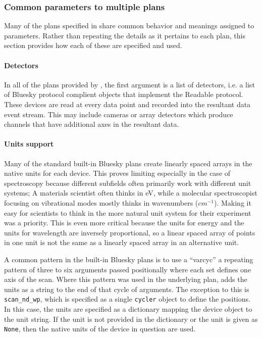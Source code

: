 \subsubsection{Common parameters to multiple plans}
\label{common_params}

Many of the plans specified in \wrightplans share common behavior and meanings assigned to parameters.
Rather than repeating the details as it pertains to each plan, this section provides how each of these are specified and used.

\paragraph{Detectors}

In all of the plans provided by \wrightplans, the first argument is a list of detectors, i.e. a list of Bluesky protocol complient objects that implement the Readable protocol.
These devices are read at every data point and recorded into the resultant data event stream.
This may include cameras or array detectors which produce channels that have additional axes in the resultant data.

\paragraph{Units support}

Many of the standard built-in Bluesky plans create linearly spaced arrays in the native units for each device.
This proves limiting especially in the case of spectroscopy because different subfields often primarily work with different unit systems; A materials scientist often thinks in eV, while a molecular spectroscopist focusing on vibrational modes mostly thinks in wavenumbers ($cm^{-1}$).
Making it easy for scientists to think in the more natural unit system for their experiment was a priority.
This is even more critical because the units for energy and the units for wavelength are inversely proportional, so a linear spaced array of points in one unit is not the same as a linearly spaced array in an alternative unit.



A common pattern in the built-in Bluesky plans is to use a ``\gls{varcyc}'' a repeating pattern of three to six arguments passed positionally where each set defines one axis of the scan.
Where this pattern was used in the underlying plan, \wrightplans adds the units as a string to the end of that cycle of arguments.
The exception to this is \texttt{scan\_nd\_wp}, which is specified as a single \texttt{cycler}\cite{cycler} object to define the positions.
In this case, the units are specified as a dictionary mapping the device object to the unit string.
If the unit is not provided in the dictionary or the unit is given as \texttt{None}, then the native units of the device in question are used.

